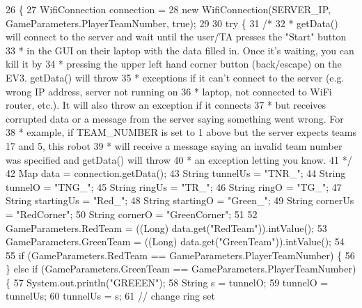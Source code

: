 \begin{DoxyCode}
26                                 \{
27     WifiConnection connection =
28         \textcolor{keyword}{new} WifiConnection(SERVER\_IP, GameParameters.PlayerTeamNumber, \textcolor{keyword}{true});
29 
30     \textcolor{keywordflow}{try} \{
31       \textcolor{comment}{/*}
32 \textcolor{comment}{       * getData() will connect to the server and wait until the user/TA presses the "Start" button}
33 \textcolor{comment}{       * in the GUI on their laptop with the data filled in. Once it's waiting, you can kill it by}
34 \textcolor{comment}{       * pressing the upper left hand corner button (back/escape) on the EV3. getData() will throw}
35 \textcolor{comment}{       * exceptions if it can't connect to the server (e.g. wrong IP address, server not running on}
36 \textcolor{comment}{       * laptop, not connected to WiFi router, etc.). It will also throw an exception if it connects}
37 \textcolor{comment}{       * but receives corrupted data or a message from the server saying something went wrong. For}
38 \textcolor{comment}{       * example, if TEAM\_NUMBER is set to 1 above but the server expects teams 17 and 5, this robot}
39 \textcolor{comment}{       * will receive a message saying an invalid team number was specified and getData() will throw}
40 \textcolor{comment}{       * an exception letting you know.}
41 \textcolor{comment}{       */}
42       Map data = connection.getData();
43       String tunnelUs = \textcolor{stringliteral}{"TNR\_"};
44       String tunnelO = \textcolor{stringliteral}{"TNG\_"};
45       String ringUs = \textcolor{stringliteral}{"TR\_"};
46       String ringO = \textcolor{stringliteral}{"TG\_"};
47       String startingUs = \textcolor{stringliteral}{"Red\_"};
48       String startingO = \textcolor{stringliteral}{"Green\_"};
49       String cornerUs = \textcolor{stringliteral}{"RedCorner"};
50       String cornerO = \textcolor{stringliteral}{"GreenCorner"};
51 
52       GameParameters.RedTeam = ((Long) data.get(\textcolor{stringliteral}{"RedTeam"})).intValue();
53       GameParameters.GreenTeam = ((Long) data.get(\textcolor{stringliteral}{"GreenTeam"})).intValue();
54 
55       \textcolor{keywordflow}{if} (GameParameters.RedTeam == GameParameters.PlayerTeamNumber) \{
56       \} \textcolor{keywordflow}{else} \textcolor{keywordflow}{if} (GameParameters.GreenTeam == GameParameters.PlayerTeamNumber) \{
57         System.out.println(\textcolor{stringliteral}{"GREEEN"});
58         String s = tunnelO;
59         tunnelO = tunnelUs;
60         tunnelUs = s;
61         \textcolor{comment}{// change ring set}

\end{DoxyCode}
